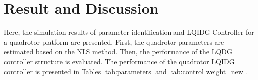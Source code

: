 \documentclass[3p,times]{elsarticle}
\begin{document}
\section{Result and Discussion}\label{sec:results}





\noindent Here, the simulation results of parameter identification and LQIDG-Controller for a quadrotor platform are presented. First, the quadrotor parameters are estimated based on the NLS method. Then, the performance of the LQDG controller structure is evaluated. The performance of the quadrotor LQIDG controller is presented in Tables \ref{tab:parameters} and \ref{tab:control weight_new}.
\end{document}
